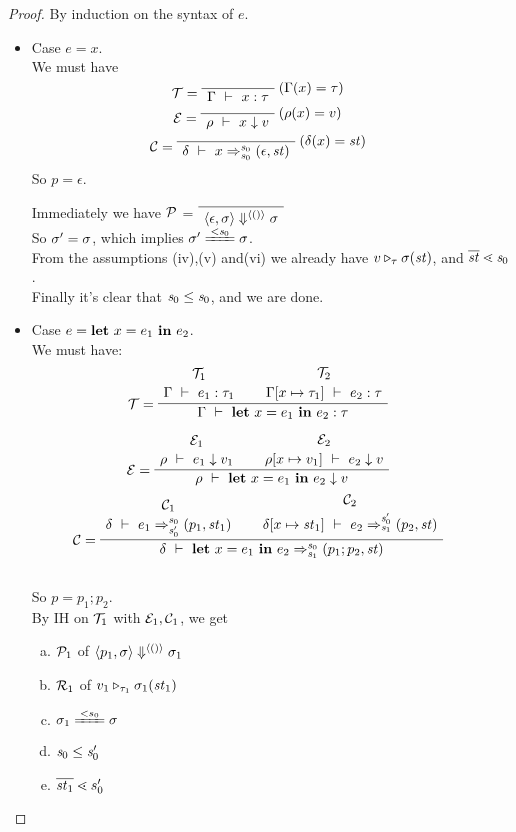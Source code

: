 \begin{proof}
	By induction on the syntax of $e$.
	
	\begin{itemize}
	
\item Case $e = x$.\\
We must have 
$$\MT = \PT{
	\AxiomC{}
	\RiLa{(\Gam(x) = \tau)}
	\UC{\Type{\Gam}{x}{\tau}}
}$$
$$ \ME = 
\PT{
	\AxiomC{}
	\RiLa{(\rho(x)=v)}
	\UC{\Eval{\rho}{x}{v}}
}$$
$$ \MC = 
\PT{\AC{}
	\RiLa{(\del(x)= \st)}
	\UC{\Trans{\del}{x}{\s_0}{\s_0}{\sfun{\epsilon}{\st}}}
}
$$
So $p= \epsilon$. 

Immediately we have $\mathcal{P}$ =
$\PT{\Axiom{\seval{\epsilon}{\sgm}{\vunit}{\sgm}}}$\\
So $\sigma' = \sigma$, which implies $\sgm'  \ConEq{\s_0} \sgm$.\\
From the assumptions (iv),(v) and(vi) we already have $v \triangleright_{\tau} \sigma(\mathit{st})$,
and $\ol{\st} \.< \s_0$. \\
Finally it's clear that $\mathit{s}_0 \le \mathit{s}_0$, and we are done.


\item \label{case-let} Case $e = \mathbf{let} \ x = e_1 \ \mathbf{in} \ e_2$. \\[1ex]
We must have:
$$\PT{
	\UCN{\MT_1}{\Type{\Gam}{e_1}{\tau_1}}
	\UCN{\MT_2}{\Type{\Gam[\Map{x}{\tau_1}]}{e_2}{\tau}}
	\LeLa{\MT =} 
	\BC{\Type{\Gam}{\Let{x}{e_1}{e_2}}{\tau}}
}$$

$$\PT{	
	\UCN{\ME_1}{\Eval{\rho}{e_1}{v_1}}
	\UCN{\ME_2}{\Eval{\rho[\Map{x}{v_1}]}{e_2}{v}}
	\LeLa{\ME =} 
	\BC{\Eval{\rho}{\Let{x}{e_1}{e_2}}{v}}
}$$ 
$$\PT{\UCN{\MC_1}{\Trans{\del}{e_1}{\s_0}{\s_0'}{\sfun{p_1}{\st_1}}}
	\UCN{\MC_2}{\Trans{\del[x \|-> {\st_1}]}{e_2}{\s_0'}{\s_1}{\sfun {p_2} {\st}}}
	\LeLa{\MC = }
	\BC{\Trans{\del}{\Let{x}{e_1}{e_2}}{\s_0}{\s_1}{\sfun {p_1;p_2} {\st}}}
}$$\\[1ex]

So $p = p_1;p_2$. \\

By IH on $\mathcal{T}_1$ with $\mathcal{E}_1,\mathcal{C}_1$, we get 
\begin{enumerate}[(a)]
	\item $\mathcal{P}_1$ of $\left\langle p_1,\sigma \right\rangle \Downarrow^{\langle () \rangle} \sigma_1$
	\item $\mathcal{R}_1$ of $v_1 \triangleright_{\tau_1} \sigma_1(\mathit{st}_1)$
	\item $\sgm_1 \ConEq{s_0} \sgm$ 
	\item $\mathit{s}_0 \le \mathit{s}_0'$
	\item $\ol{\st_1} \.< {s_0'}$
\end{enumerate}


\end{itemize}
\end{proof}
